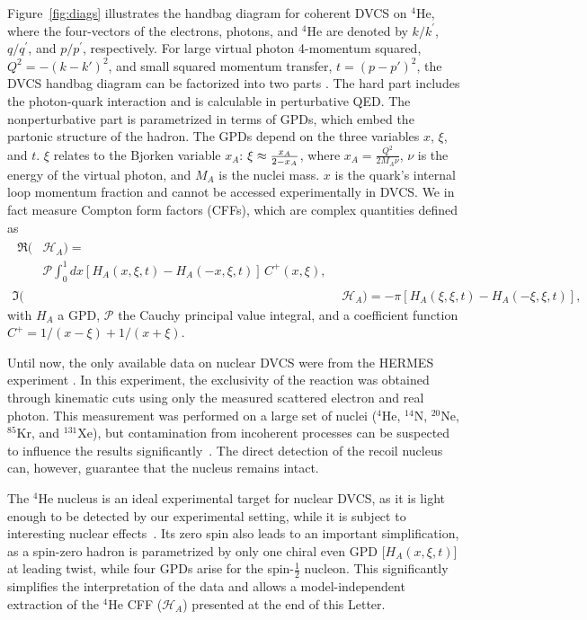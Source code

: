 \documentclass[twocolumn,nofootinbib,prl,superscriptaddress,secnumarabic,amssymb,nobibnotes,aps,floatfix]{revtex4}
\begin{document}
Figure~\ref{fig:diags} illustrates the handbag diagram for coherent DVCS on 
$^4$He, where the four-vectors of the electrons, photons, and $^4$He are 
denoted by $k/k^\prime$, $q/q^\prime$, and $p/p^\prime$, respectively. For 
large virtual photon 4-momentum squared, $Q^2=-(k-k')^{2}$, and small squared 
momentum transfer, $t=(p-p')^{2}$, the DVCS handbag diagram can be factorized 
into two parts \cite{Freund_Collins,Ji_Osborne}. The hard part includes the 
photon-quark interaction and is calculable in perturbative QED. The 
nonperturbative part is parametrized in terms of GPDs, which embed the partonic 
structure of the hadron. The GPDs depend on the three variables $x$, $\xi$, and 
$t$. $\xi$ relates to the Bjorken variable $x_{A}$: $\xi\approx 
{{x_A}\over{2-x_A}}$, where $x_A=\frac{Q^2}{2M_A\nu}$, $\nu$ is the energy of 
the virtual photon, and $M_A$ is the nuclei mass. $x$ is the quark's internal 
loop momentum fraction and cannot be accessed experimentally in DVCS.  We in 
fact measure Compton form factors (CFFs), which are complex quantities defined 
as
\begin{align}
\begin{split}
\Re(&\mathcal{H}_{A}) = \\
    &\mathcal{P} \int_{0}^{1}dx[H_A(x,\xi,t)-H_A(-x,\xi,t)] \, C^{+}(x,\xi), 
\end{split} \\
\Im(&\mathcal{H}_{A}) = - \pi [H_A(\xi,\xi,t)-H_A(-\xi,\xi,t)],
\end{align}
with $H_A$ a GPD, $\mathcal{P}$ the Cauchy principal value integral, and a 
coefficient function $C^{+}= 1/(x-\xi) + 1/(x+\xi)$.

Until now, the only available data on nuclear DVCS were from the HERMES 
experiment \cite{Airapetian:2010nu}. In this experiment, the exclusivity of 
the reaction was obtained through kinematic cuts using only the measured 
scattered electron and real photon. This measurement was performed on a large 
set of nuclei ($^4$He, $^{14}$N, $^{20}$Ne, $^{85}$Kr, and $^{131}$Xe), but 
contamination from incoherent processes can be suspected to influence the 
results significantly~\cite{Guzey:2003jh}. The direct detection of the recoil 
nucleus can, however, guarantee that the nucleus remains intact. 

The $^4$He nucleus is an ideal experimental target for nuclear DVCS, as it is 
light enough to be detected by our experimental setting, while it is subject 
to interesting nuclear effects~\cite{JSeely}. Its zero spin also leads to an 
important simplification, as a spin-zero hadron is parametrized by only one 
chiral even GPD [$H_{A}(x,\xi,t)$] at leading twist, while four GPDs arise for 
the spin-$\frac{1}{2}$ nucleon. This significantly simplifies the 
interpretation of the data and allows a model-independent extraction of the 
$^4$He CFF ($\mathcal{H}_{A}$) presented at the end of this Letter. 
\end{document}
